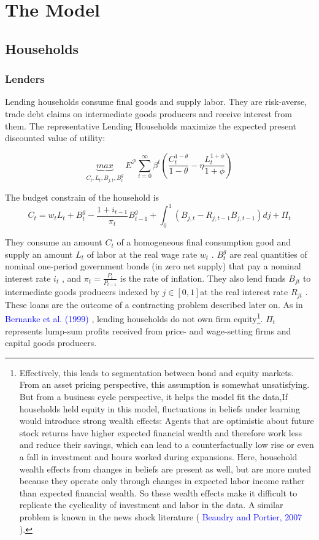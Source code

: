 \documentclass[cn,10pt,math=newtx,citestyle=gb7714-2015,bibstyle=gb7714-2015]{elegantbook}
\begin{document}
{{	\section{The Model}
	\subsection{Households}
	\subsubsection{Lenders}
	Lending households consume final goods and supply labor. They are risk-averse, trade debt claims on intermediate goods producers and receive interest from them.
	The representative Lending Households maximize the expected present discounted value of utility:
	
	\begin{equation*}
		\underbrace{max}_{C_t,L_t,B_{j,t},B_t^g}~\mathit{E}^{\mathcal{P}} \sum_{t=0}^{\infty}\beta^t\left(\frac{C_{t}^{1-\theta}}{1-\theta}-\eta \frac{L_{t}^{1+\phi}}{1+\phi}\right)
	\end{equation*}
	
	The budget constrain of the household is
	\begin{equation*}
		C_t=w_tL_t+B_t^g-\frac{1+i_{t-1}}{\pi_t}B_{t-1}^g+\int_0^1(B_{j,t}-R_{j,t-1}B_{j,t-1})dj+\Pi_t
	\end{equation*}
	
	They consume an amount $C_t$ of a homogeneous final consumption good and supply an amount $L_t$ of labor at the real wage rate $w _t$ . $B^ g_ t$ are real quantities of nominal one-period government bonds (in zero net supply) that pay a nominal interest rate $i_ t$ , and $\pi_t=\frac{P_t}{P_{t-1}}$ is the rate of inflation. They also lend funds $B_{ jt}$ to intermediate goods producers indexed by $j \in [0, 1] $at the real interest rate $R _{jt}$ . These loans are the outcome of a contracting problem described later on. As in \textcolor{blue}{Bernanke et al. (1999)} , lending households do not own firm equity\footnote{Effectively, this leads to segmentation between bond and equity markets. From an asset pricing perspective, this assumption is somewhat unsatisfying. But from a business cycle perspective, it helps the model fit the data,If households held equity in this model, 
		fluctuations in beliefs under learning would introduce strong wealth effects: Agents that are optimistic about future stock returns have higher expected financial wealth and therefore work less and reduce their savings, which can lead to a counterfactually low rise or even a fall in investment and hours worked during expansions. Here, household wealth effects from changes in beliefs are present as well, but are more muted because they operate only through changes in expected labor income rather than expected financial wealth. So these wealth effects make it difficult to replicate the cyclicality of investment and labor in the data. A similar problem is known in the news shock literature ( \textcolor{blue}{Beaudry and Portier, 2007} ).}. $\Pi_t$ represents lump-sum profits received from price- and wage-setting firms and capital goods producers. 
	
}}
\end{document}
